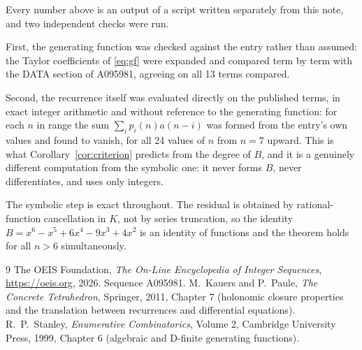 \documentclass[11pt,a4paper]{article}
\theoremstyle{plain}
\theoremstyle{definition}
\begin{document}
Every number above is an output of a script written separately from this note, and two
independent checks were run.

First, the generating function was checked against the entry rather than assumed: the
Taylor coefficients of \eqref{eq:gf} were expanded and compared term by term with the DATA
section of A095981, agreeing on all 13 terms compared.

Second, the recurrence itself was evaluated directly on the published terms, in exact
integer arithmetic and without reference to the generating function: for each $n$ in range
the sum $\sum_{i}p_{i}(n)a(n-i)$ was formed from the entry's own values and found to
vanish, for all 24 values of $n$ from $n=7$ upward. This is what
Corollary~\ref{cor:criterion} predicts from the degree of $B$, and it is a genuinely
different computation from the symbolic one: it never forms $B$, never differentiates, and
uses only integers.

The symbolic step is exact throughout. The residual is obtained by rational-function
cancellation in $K$, not by series truncation, so the identity $B=x^{6} - x^{5} + 6 x^{4} - 9 x^{3} + 4 x^{2}$ is an
identity of functions and the theorem holds for all $n>6$ simultaneously.

\begin{thebibliography}{9}
 The OEIS Foundation, \emph{The On-Line Encyclopedia of Integer Sequences},
\url{https://oeis.org}, 2026. Sequence A095981.
 M.~Kauers and P.~Paule, \emph{The Concrete Tetrahedron}, Springer, 2011,
Chapter 7 (holonomic closure properties and the translation between recurrences and
differential equations).
 R.~P.~Stanley, \emph{Enumerative Combinatorics}, Volume 2, Cambridge
University Press, 1999, Chapter 6 (algebraic and D-finite generating functions).
\end{thebibliography}
\end{document}
